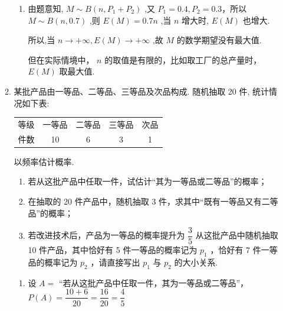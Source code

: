 \begin{enumerate}
\begin{enumerate}
\begin{jieda}
\begin{enumerate}
                \item 由题意知, $M \sim  B\left( {n,{P}_{1} + {P}_{2}}\right)$ ,又 ${P}_{1} = {0.4},{P}_{2} = {0.3}$，所以 $M \sim  B\left( {n,{0.7}}\right)$ ,则 $E\left( M\right)  = {0.7n}$ ,当 $n$ 增大时, $E\left( M\right)$ 也增大.
                
                所以,当 $n \rightarrow   + \infty ,E\left( M\right)  \rightarrow   + \infty$ ,故 $M$ 的数学期望没有最大值.
                
                但在实际情境中， $n$ 的取值是有限的，比如取工厂的总产量时， $E\left( M\right)$ 取最大值.
            \end{enumerate}
        \end{jieda}
        \item 某批产品由一等品、二等品、三等品及次品构成. 随机抽取 20 件, 统计情况如下表:
        
        \begin{center}
        \begin{tabular}{|c|c|c|c|c|}
        \hline
        等级 & 一等品 & 二等品 & 三等品 & 次品 \\
        \cline{1-5}
        件数 & 10 & 6 & 3 & 1 \\
        \cline{1-5}
        \hline
        \end{tabular}
        
        \end{center}
        
        以频率估计概率.
        \begin{enumerate}
            \item 若从这批产品中任取一件，试估计“其为一等品或二等品”的概率；
            
            \item 在抽取的 20 件产品中，随机抽取 3 件，求其中“既有一等品又有二等品”的概率；
            
            \item 若改进技术后，产品为一等品的概率提升为 $\dfrac{3}{5}$ 从这批产品中随机抽取 10 件产品，其中恰好有 5 件一等品的概率记为 ${p}_{1}$ ，恰好有 7 件一等品的概率记为 ${p}_{2}$ ，请直接写出 ${p}_{1}$ 与 ${p}_{2}$ 的大小关系.
        \end{enumerate}

        \begin{jieda}
            \begin{enumerate}
                \item 设 $A =$ “若从这批产品中任取一件，其为一等品或二等品”，$P\left( A\right)  = \dfrac{{10} + 6}{20} = \dfrac{16}{20} = \dfrac{4}{5}$
                

\end{enumerate}
\end{jieda}
\end{enumerate}
\end{enumerate}
